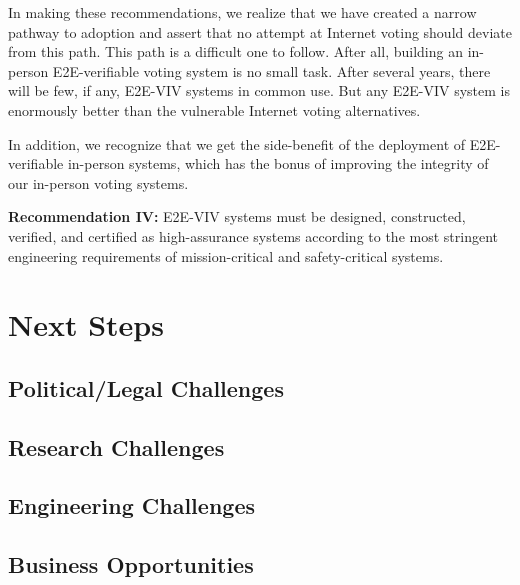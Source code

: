 In making these recommendations, we realize that we have created a
narrow pathway to adoption and assert that no attempt at Internet
voting should deviate from this path.  This path is a difficult one to
follow.  After all, building an in-person E2E-verifiable voting system
is no small task.  After several years, there will be few, if any,
E2E-VIV systems in common use.  But any E2E-VIV system is enormously
better than the vulnerable Internet voting alternatives.  

In addition, we recognize that we get the side-benefit of the
deployment of E2E-verifiable in-person systems, which has the bonus of
improving the integrity of our in-person voting systems.

\begin{center}
  \textbf{Recommendation IV:} E2E-VIV systems must be designed,
  constructed, verified, and certified as high-assurance systems
  according to the most stringent engineering requirements of
  mission-critical and safety-critical systems.
\end{center}

\section{Next Steps}
\label{sec:next-steps}

\subsection{Political/Legal Challenges}
\subsection{Research Challenges}
\subsection{Engineering Challenges}
\subsection{Business Opportunities}
